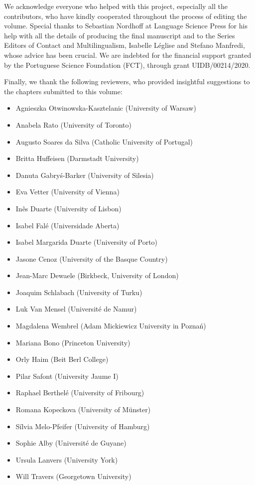 \begin{refsection}

We acknowledge everyone who helped with this project, especially all the contributors, who have kindly cooperated throughout the process of editing the volume. Special thanks to Sebastian Nordhoff at Language Science Press for his help with all the details of producing the final manuscript and to the Series Editors of Contact and Multilingualism, Isabelle Léglise and Stefano Manfredi, whose advice has been crucial. We are indebted for the financial support granted by the Portuguese Science Foundation (FCT), through grant UIDB/00214/2020.

Finally, we thank the following reviewers, who provided insightful suggestions to the chapters submitted to this volume:\largerpage

\begin{itemize}[noitemsep]
\item Agnieszka Otwinowska-Kasztelanic (University of Warsaw)
\item Anabela Rato (University of Toronto)
\item Augusto Soares da Silva (Catholic University of Portugal)
\item Britta Huffeisen (Darmstadt University)
\item Danuta Gabryś-Barker (University of Silesia)
\item Eva Vetter (University of Vienna)
\item Inês Duarte (University of Lisbon)
\item Isabel Falé (Universidade Aberta) 
\item Isabel Margarida Duarte (University of Porto)
\item Jasone Cenoz (University of the Basque Country)
\item Jean-Marc Dewaele (Birkbeck, University of London)
\item Joaquim Schlabach (University of Turku)
\item Luk Van Mensel (Université de Namur)
\item Magdalena Wembrel (Adam Mickiewicz University in Poznań)
\item Mariana Bono (Princeton University)
\item Orly Haim (Beit Berl College)
\item Pilar Safont (University Jaume I)  
\item Raphael Berthelé (University of Fribourg)
\item Romana Kopeckova (University of Münster)
\item Sílvia Melo-Pfeifer (University of Hamburg)
\item Sophie Alby (Université de Guyane)
\item Ursula Lanvers (University York)
\item Will Travers (Georgetown University)
\end{itemize}

\printbibliography[heading=subbibliography]
\end{refsection}

